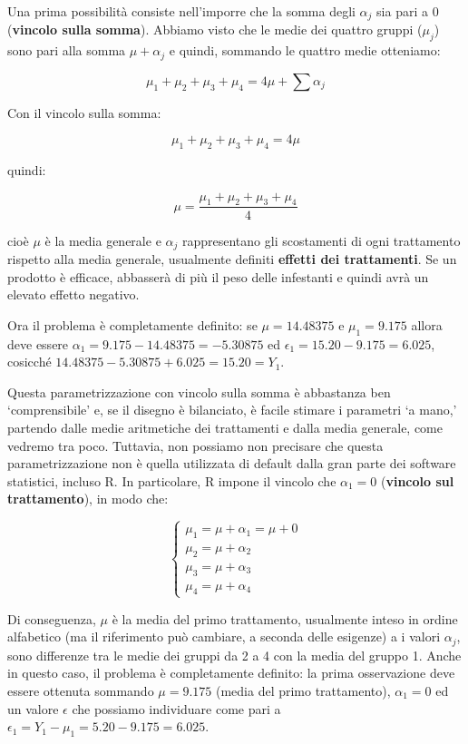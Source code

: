 \documentclass[a4paper,12pt,oneside]{book}
\begin{document}
Una prima possibilità consiste nell'imporre che la somma degli \(\alpha_j\) sia pari a 0 (\textbf{vincolo sulla somma}). Abbiamo visto che le medie dei quattro gruppi (\(\mu_j\)) sono pari alla somma \(\mu + \alpha_j\) e quindi, sommando le quattro medie otteniamo:

\[ \mu_1 + \mu_2 + \mu_3 + \mu_4 = 4 \mu + \sum{\alpha_j}\]

Con il vincolo sulla somma:

\[ \mu_1 + \mu_2 + \mu_3 + \mu_4 = 4 \mu\]

quindi:

\[\mu = \frac{\mu_1 + \mu_2 + \mu_3 + \mu_4}{4} \]

cioè \(\mu\) è la media generale e \(\alpha_j\) rappresentano gli scostamenti di ogni trattamento rispetto alla media generale, usualmente definiti \textbf{effetti dei trattamenti}. Se un prodotto è efficace, abbasserà di più il peso delle infestanti e quindi avrà un elevato effetto negativo.

Ora il problema è completamente definito: se \(\mu = 14.48375\) e \(\mu_1 = 9.175\) allora deve essere \(\alpha_1 = 9.175 - 14.48375 = -5.30875\) ed \(\epsilon_1 = 15.20 - 9.175 = 6.025\), cosicché \(14.48375 - 5.30875 + 6.025 = 15.20 = Y_1\).

Questa parametrizzazione con vincolo sulla somma è abbastanza ben `comprensibile' e, se il disegno è bilanciato, è facile stimare i parametri `a mano,' partendo dalle medie aritmetiche dei trattamenti e dalla media generale, come vedremo tra poco. Tuttavia, non possiamo non precisare che questa parametrizzazione non è quella utilizzata di default dalla gran parte dei software statistici, incluso R. In particolare, R impone il vincolo che \(\alpha_1 = 0\) (\textbf{vincolo sul trattamento}), in modo che:

\[ \left\{ {\begin{array}{l}
\mu_1 = \mu + \alpha_1 = \mu + 0\\
\mu_2 = \mu + \alpha_2 \\
\mu_3 = \mu + \alpha_3 \\
\mu_4 = \mu + \alpha_4
\end{array}} \right.\]

Di conseguenza, \(\mu\) è la media del primo trattamento, usualmente inteso in ordine alfabetico (ma il riferimento può cambiare, a seconda delle esigenze) a i valori \(\alpha_j\), sono differenze tra le medie dei gruppi da 2 a 4 con la media del gruppo 1. Anche in questo caso, il problema è completamente definito: la prima osservazione deve essere ottenuta sommando \(\mu = 9.175\) (media del primo trattamento), \(\alpha_1 = 0\) ed un valore \(\epsilon\) che possiamo individuare come pari a \(\epsilon_1 = Y_1 - \mu_1 = 5.20 - 9.175 = 6.025\).
\end{document}
